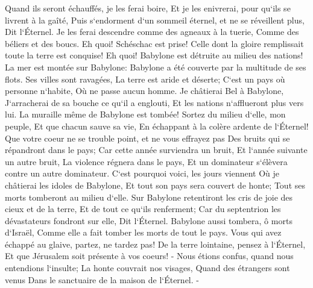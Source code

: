 \verse Quand ils seront échauffés, je les ferai boire, Et je les enivrerai, pour qu`ils se livrent à la gaîté, Puis s`endorment d`un sommeil éternel, et ne se réveillent plus, Dit l`Éternel. 
\verse Je les ferai descendre comme des agneaux à la tuerie, Comme des béliers et des boucs. 
\verse Eh quoi! Schéschac est prise! Celle dont la gloire remplissait toute la terre est conquise! Eh quoi! Babylone est détruite au milieu des nations! 
\verse La mer est montée sur Babylone: Babylone a été couverte par la multitude de ses flots. 
\verse Ses villes sont ravagées, La terre est aride et déserte; C`est un pays où personne n`habite, Où ne passe aucun homme. 
\verse Je châtierai Bel à Babylone, J`arracherai de sa bouche ce qu`il a englouti, Et les nations n`afflueront plus vers lui. La muraille même de Babylone est tombée! 
\verse Sortez du milieu d`elle, mon peuple, Et que chacun sauve sa vie, En échappant à la colère ardente de l`Éternel! 
\verse Que votre coeur ne se trouble point, et ne vous effrayez pas Des bruits qui se répandront dans le pays; Car cette année surviendra un bruit, Et l`année suivante un autre bruit, La violence régnera dans le pays, Et un dominateur s`élèvera contre un autre dominateur. 
\verse C`est pourquoi voici, les jours viennent Où je châtierai les idoles de Babylone, Et tout son pays sera couvert de honte; Tout ses morts tomberont au milieu d`elle. 
\verse Sur Babylone retentiront les cris de joie des cieux et de la terre, Et de tout ce qu`ils renferment; Car du septentrion les dévastateurs fondront sur elle, Dit l`Éternel. 
\verse Babylone aussi tombera, ô morts d`Israël, Comme elle a fait tomber les morts de tout le pays. 
\verse Vous qui avez échappé au glaive, partez, ne tardez pas! De la terre lointaine, pensez à l`Éternel, Et que Jérusalem soit présente à vos coeurs! - 
\verse Nous étions confus, quand nous entendions l`insulte; La honte couvrait nos visages, Quand des étrangers sont venus Dans le sanctuaire de la maison de l`Éternel. - 
